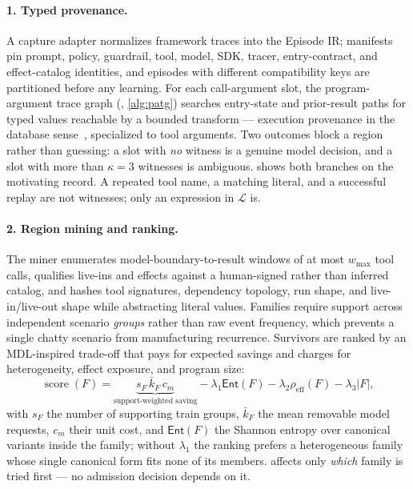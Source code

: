 \paragraph{1. Typed provenance.}
A capture adapter normalizes framework traces into the Episode IR; manifests
pin prompt, policy, guardrail, tool, model, SDK, tracer, entry-contract, and
effect-catalog identities, and episodes with different compatibility keys are
partitioned before any learning. For each call-argument slot, the
program-argument trace graph (\patg, \cref{alg:patg}) searches entry-state and
prior-result paths for typed values reachable by a bounded transform --- execution
provenance in the database sense~\citep{cheney2009provenance}, specialized to
tool arguments. Two outcomes block a region rather than guessing: a slot with
\emph{no} witness is a genuine model decision, and a slot with more than
$\kappa=3$ witnesses is ambiguous.  shows both branches on
the motivating record. A repeated tool name, a matching literal, and a
successful replay are not witnesses; only an expression in $\mathcal{L}$ is.

\paragraph{2. Region mining and ranking.}
The miner enumerates model-boundary-to-result windows of at most $w_{\max}$
tool calls, qualifies live-ins and effects against a human-signed rather than
inferred catalog, and hashes tool signatures,
dependency topology, run shape, and live-in/live-out shape while abstracting
literal values. Families require support across independent scenario
\emph{groups} rather than raw event frequency, which prevents a single chatty
scenario from manufacturing recurrence. Survivors are ranked by an
MDL-inspired trade-off that pays for expected savings and charges
for heterogeneity, effect exposure, and program size:
\begin{equation}
  \operatorname{score}(F)=
  \underbrace{s_F\,\bar{k}_F\,c_m}_{\text{support-weighted saving}}
  -\lambda_1 \mathsf{Ent}(F)-\lambda_2\rho_{\mathrm{eff}}(F)-\lambda_3|F| ,
  \label{eq:score}
\end{equation}
with $s_F$ the number of supporting train groups, $\bar{k}_F$ the mean removable model requests,
$c_m$ their unit cost, and $\mathsf{Ent}(F)$ the Shannon entropy over canonical variants
inside the family; without $\lambda_1$ the ranking prefers a heterogeneous
family whose single canonical form fits none of its members.
 affects only \emph{which} family is tried first --- no
admission decision depends on it.

